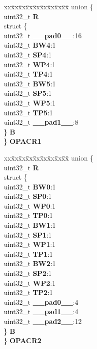 \begin{DoxyCompactItemize}
\begin{tabbing}
\end{tabbing}\item 
\mbox{\label{structPBRIDGE__B__tag_aacdab0972f46404cd6bb4374a6541398}} 
\begin{tabbing}
xx\=xx\=xx\=xx\=xx\=xx\=xx\=xx\=xx\=\kill
union \{\\
\>uint32\_t {\bfseries R}\\
\>struct \{\\
\>\>uint32\_t {\bfseries \_\_pad0\_\_}:16\\
\>\>uint32\_t {\bfseries BW4}:1\\
\>\>uint32\_t {\bfseries SP4}:1\\
\>\>uint32\_t {\bfseries WP4}:1\\
\>\>uint32\_t {\bfseries TP4}:1\\
\>\>uint32\_t {\bfseries BW5}:1\\
\>\>uint32\_t {\bfseries SP5}:1\\
\>\>uint32\_t {\bfseries WP5}:1\\
\>\>uint32\_t {\bfseries TP5}:1\\
\>\>uint32\_t {\bfseries \_\_pad1\_\_}:8\\
\>\} {\bfseries B}\\
\} {\bfseries OPACR1}\\

\end{tabbing}\item 
\mbox{\label{structPBRIDGE__B__tag_ad1d4bbb3f0cfcf2d539d25b64c30d638}} 
\begin{tabbing}
xx\=xx\=xx\=xx\=xx\=xx\=xx\=xx\=xx\=\kill
union \{\\
\>uint32\_t {\bfseries R}\\
\>struct \{\\
\>\>uint32\_t {\bfseries BW0}:1\\
\>\>uint32\_t {\bfseries SP0}:1\\
\>\>uint32\_t {\bfseries WP0}:1\\
\>\>uint32\_t {\bfseries TP0}:1\\
\>\>uint32\_t {\bfseries BW1}:1\\
\>\>uint32\_t {\bfseries SP1}:1\\
\>\>uint32\_t {\bfseries WP1}:1\\
\>\>uint32\_t {\bfseries TP1}:1\\
\>\>uint32\_t {\bfseries BW2}:1\\
\>\>uint32\_t {\bfseries SP2}:1\\
\>\>uint32\_t {\bfseries WP2}:1\\
\>\>uint32\_t {\bfseries TP2}:1\\
\>\>uint32\_t {\bfseries \_\_pad0\_\_}:4\\
\>\>uint32\_t {\bfseries \_\_pad1\_\_}:4\\
\>\>uint32\_t {\bfseries \_\_pad2\_\_}:12\\
\>\} {\bfseries B}\\
\} {\bfseries OPACR2}\\


\end{tabbing}
\end{DoxyCompactItemize}
